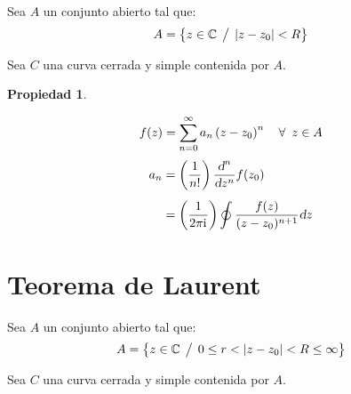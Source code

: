 \documentclass[a5paper,12pt,twoside]{book}
\newtheorem{prop}{{Propiedad}}[chapter]
\begin{document}
Sea $A$ un conjunto abierto tal que:
\begin{equation*}
    A = { \left\{ {z \in \mathbb{C} \hspace{1ex} \big/ \hspace{1ex} {\left| {z-z_0} \right|}<R} \right\} }
\end{equation*}

Sea $C$ una curva cerrada y simple contenida por $A$.

\begin{center}
\end{center}

\begin{mdframed}[style=MyFrame1]
    \begin{prop}
    \end{prop}
    \begin{equation*}
        f(z) = \sum_{n=0}^\infty a_n \left(z-z_0\right)^n \quad \forall \enspace z \in A
    \end{equation*}
    \begin{align*}
        a_n &= \left( \frac{1}{n!} \right) \frac{\textsl{d}^n}{\textsl{d} z^n} f(z_0)
        \\[1ex]
        &= \left( \frac{1}{2 \pi \mathrm{i}\mkern1mu} \right) \oint \frac{f(z)}{(z-z_0)^{n+1}} \textsl{d} z
    \end{align*}
\end{mdframed}


\section{Teorema de Laurent}
\label{sec:Laurent}

Sea $A$ un conjunto abierto tal que:
\begin{equation*}
    A = { \left\{ {z \in \mathbb{C} \hspace{1ex} \big/ \hspace{1ex} 0 \leq r< {\left| {z-z_0} \right|}<R \leq \infty} \right\} }
\end{equation*}

Sea $C$ una curva cerrada y simple contenida por $A$.

\begin{center}
\end{center}
\end{document}
